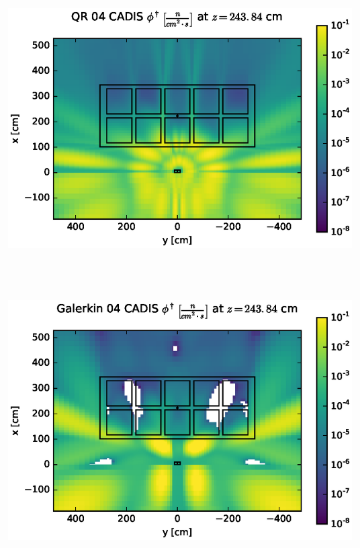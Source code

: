 \clearpage
\begin{figure}[!htb]
\begin{subfigure}{\textwidth}
\centering
\includegraphics[max height=0.445\textheight]
{img/cargo-plots/cad-adj/flux-qr04-slice.eps}
\end{subfigure}
\\
\begin{subfigure}{\textwidth}
\centering
\includegraphics[max height=0.445\textheight]
{img/cargo-plots/cad-adj/flux-gkn04-slice.eps}
\label{cargo-cad-gkn}
\end{subfigure}
\end{figure}
\clearpage
